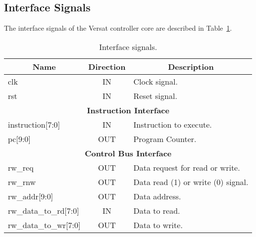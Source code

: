 \subsection{Interface Signals}
\label{sec:is}

The interface signals of the Versat controller core are described in Table~\ref{tab:is}.

\begin{table}[h]
\centering
\begin{tabular}{|l|c|l|}
\hline
\multicolumn{1}{|c|}{\bf Name} & {\bf Direction} & \multicolumn{1}{c|}{\bf Description}                                                     \\ \hline \hline
\multicolumn{1}{|l|}{clk}                                & IN              & Clock signal.                                                  \\ \hline
\multicolumn{1}{|l|}{rst}                                & IN              & \multicolumn{1}{l|}{Reset signal.}                             \\ \hline \hline
\multicolumn{3}{|c|}{{\bf Instruction Interface}}                                                                                           \\ \hline \hline
instruction{[}7:0{]}                                     & IN              & Instruction to execute.                                        \\ \hline
pc{[}9:0{]}                                              & OUT             & Program Counter.                                               \\ \hline \hline
\multicolumn{3}{|c|}{{\bf Control Bus Interface}}                                                                                           \\ \hline \hline
rw\_req                                                  & OUT             & Data request for read or write.                                \\ \hline
rw\_rnw                                                  & OUT             & Data read (1) or write (0) signal.                             \\ \hline
rw\_addr{[}9:0{]}                                        & OUT             & Data address.                                                  \\ \hline
rw\_data\_to\_rd{[}7:0{]}                                & IN              & Data to read.                                                  \\ \hline
rw\_data\_to\_wr{[}7:0{]}                                & OUT             & Data to write.                                                 \\ \hline
\end{tabular}
\caption{Interface signals.}
\label{tab:is}
\end{table}

